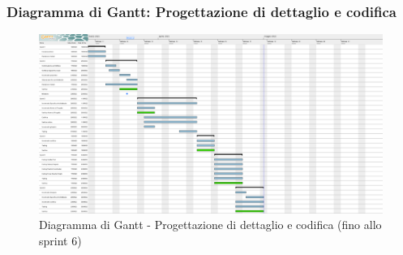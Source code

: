 \subsubsection{Diagramma di Gantt: Progettazione di dettaglio e codifica}
\begin{figure}[h!]
    \centering
    \includegraphics[scale=0.18]{../../assets/Diagrammi_Gantt/DettaglioECodifica.png}
    \caption{Diagramma di Gantt - Progettazione di dettaglio e codifica (fino allo sprint 6)}
\end{figure}
